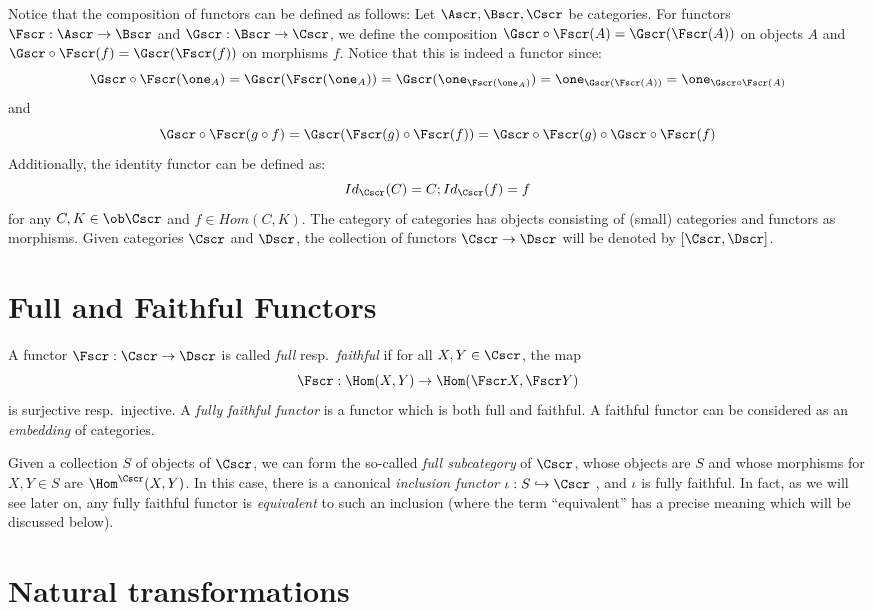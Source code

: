 \begin{example}
  Notice that the composition of functors can be defined as follows:
  Let $\Ascr,\Bscr,\Cscr$ be categories. 
  For functors $\Fscr : \Ascr \to \Bscr$ and $\Gscr : \Bscr \to \Cscr$, we define the composition $\Gscr\circ\Fscr(A)=\Gscr(\Fscr(A))$ on objects $A$ and $\Gscr\circ\Fscr(f)=\Gscr(\Fscr(f))$ on morphisms $f$.
  Notice that this is indeed a functor since: 
  \[\Gscr\circ\Fscr(\one_A)=\Gscr(\Fscr(\one_A))=\Gscr(\one_{\Fscr(\one_A)})=\one_{\Gscr(\Fscr(A))}=\one_{\Gscr\circ\Fscr(A)}\]
  and 
  \[\Gscr\circ\Fscr(g\circ f)=\Gscr(\Fscr(g)\circ\Fscr(f))=\Gscr\circ\Fscr(g)\circ \Gscr\circ\Fscr(f)\]
  Additionally, the identity functor can be defined as:
  \[Id_\Cscr(C)=C; Id_\Cscr(f)=f\]
  for any $C,K \in \ob\Cscr$ and $f\in Hom(C,K)$.
  The category of categories has objects consisting of (small) categories and functors as morphisms.
  Given categories $\Cscr$ and $\Dscr$, the collection of functors $\Cscr \to \Dscr$ will be denoted by $[\Cscr,\Dscr]$.
\end{example}

\section{Full and Faithful Functors}

A functor $\Fscr : \Cscr \to \Dscr$ is called \emph{full} resp.~\emph{faithful} if for all $X,Y \in \Cscr$, the map
\[ \Fscr : \Hom(X,Y) \to \Hom(\Fscr X, \Fscr Y) \]
is surjective resp.~injective.
A \emph{fully faithful functor} is a functor which is both full and faithful.
A faithful functor can be considered as an \emph{embedding} of categories.

Given a collection $S$ of objects of $\Cscr$, we can form the so-called \emph{full subcategory} of $\Cscr$, whose objects are $S$ and whose morphisms for $X,Y \in S$ are $\Hom^{\Cscr}(X,Y)$.
In this case, there is a canonical \emph{inclusion functor} $\iota : S \hookrightarrow \Cscr$ , and $\iota$ is fully faithful.
In fact, as we will see later on, any fully faithful functor is \emph{equivalent} to such an inclusion (where the term ``equivalent'' has a precise meaning which will be discussed below).

\section{Natural transformations}

